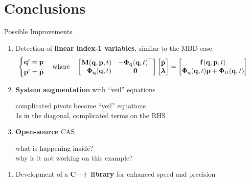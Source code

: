 
\section{Conclusions}

\begin{frame}{Possible Improvements}
    \begin{enumerate}
      \item<1> Detection of \textbf{linear index-1 variables}, similar to the \acs{MBD} case
      \begin{equation*}
        \begin{cases}
          \mathbf{q}^{\prime} = \mathbf{p} \\
          \mathbf{p}^{\prime} = \dot{\mathbf{p}}
        \end{cases}
        \text{where} \quad
        \begin{bmatrix}
          \mathbf{M}(\mathbf{q}, \mathbf{p}, t)      & -\boldsymbol{\Phi}_{\mathbf{q}}(\mathbf{q}, t)^{\top} \\
          -\boldsymbol{\Phi}_{\mathbf{q}}(\mathbf{q}, t) & \mathbf{0}
        \end{bmatrix}
        \begin{bmatrix}
          \dot{\mathbf{p}} \\ \boldsymbol{\lambda}
        \end{bmatrix} = \begin{bmatrix}
          \mathbf{f}(\mathbf{q}, \mathbf{p}, t) \\
          \dot{\boldsymbol{\Phi}}_{\mathbf{q}}(\mathbf{q}, t)\mathbf{p} + \boldsymbol{\Phi}_{tt}(\mathbf{q}, t)
        \end{bmatrix}
      \end{equation*}
      \item<2> \textbf{System augmentation} with ``veil'' equations \\
      \begin{small}
        \qquad complicated pivots become ``veil'' equations \\
        \qquad 1s in the diagonal, complicated terms on the RHS
      \end{small}
      \item<3> \textbf{Open-source} \acs{CAS} \\
      \begin{small}
        \qquad what is happening inside? \\
        \qquad why is it not working on this example?
      \end{small}
    \end{enumerate}
    \begin{enumerate}
      \item<4> Development of a \textbf{C++ library} for enhanced speed and precision
    \end{enumerate}
\end{frame}

